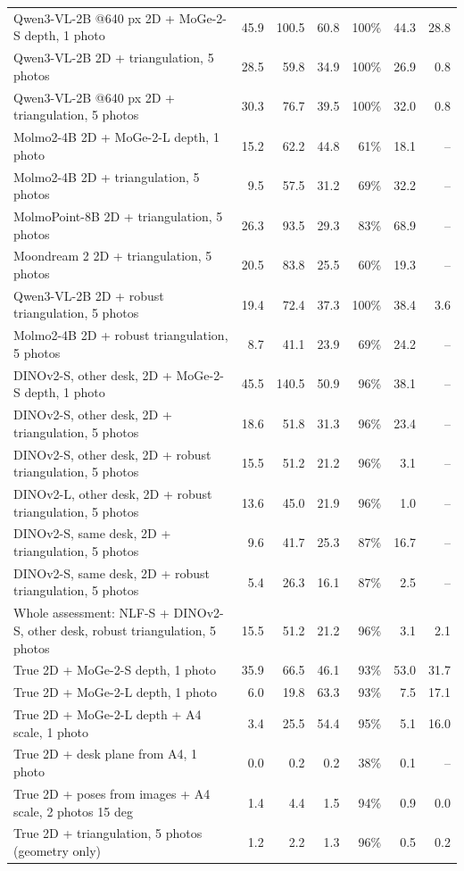{\begin{tabular}{@{}p{6.3cm}rrrrrr@{}}
Qwen3-VL-2B @640 px 2D + MoGe-2-S depth, 1 photo & 45.9 & 100.5 & 60.8 & 100\% & 44.3 & 28.8 \\
Qwen3-VL-2B 2D + triangulation, 5 photos & 28.5 & 59.8 & 34.9 & 100\% & 26.9 & 0.8 \\
Qwen3-VL-2B @640 px 2D + triangulation, 5 photos & 30.3 & 76.7 & 39.5 & 100\% & 32.0 & 0.8 \\
Molmo2-4B 2D + MoGe-2-L depth, 1 photo & 15.2 & 62.2 & 44.8 & 61\% & 18.1 & -- \\
Molmo2-4B 2D + triangulation, 5 photos & 9.5 & 57.5 & 31.2 & 69\% & 32.2 & -- \\
MolmoPoint-8B 2D + triangulation, 5 photos & 26.3 & 93.5 & 29.3 & 83\% & 68.9 & -- \\
Moondream 2 2D + triangulation, 5 photos & 20.5 & 83.8 & 25.5 & 60\% & 19.3 & -- \\
Qwen3-VL-2B 2D + robust triangulation, 5 photos & 19.4 & 72.4 & 37.3 & 100\% & 38.4 & 3.6 \\
Molmo2-4B 2D + robust triangulation, 5 photos & 8.7 & 41.1 & 23.9 & 69\% & 24.2 & -- \\
DINOv2-S, other desk, 2D + MoGe-2-S depth, 1 photo & 45.5 & 140.5 & 50.9 & 96\% & 38.1 & -- \\
DINOv2-S, other desk, 2D + triangulation, 5 photos & 18.6 & 51.8 & 31.3 & 96\% & 23.4 & -- \\
DINOv2-S, other desk, 2D + robust triangulation, 5 photos & 15.5 & 51.2 & 21.2 & 96\% & 3.1 & -- \\
DINOv2-L, other desk, 2D + robust triangulation, 5 photos & 13.6 & 45.0 & 21.9 & 96\% & 1.0 & -- \\
DINOv2-S, same desk, 2D + triangulation, 5 photos & 9.6 & 41.7 & 25.3 & 87\% & 16.7 & -- \\
DINOv2-S, same desk, 2D + robust triangulation, 5 photos & 5.4 & 26.3 & 16.1 & 87\% & 2.5 & -- \\
Whole assessment: NLF-S + DINOv2-S, other desk, robust triangulation, 5 photos & 15.5 & 51.2 & 21.2 & 96\% & 3.1 & 2.1 \\
True 2D + MoGe-2-S depth, 1 photo & 35.9 & 66.5 & 46.1 & 93\% & 53.0 & 31.7 \\
True 2D + MoGe-2-L depth, 1 photo & 6.0 & 19.8 & 63.3 & 93\% & 7.5 & 17.1 \\
True 2D + MoGe-2-L depth + A4 scale, 1 photo & 3.4 & 25.5 & 54.4 & 95\% & 5.1 & 16.0 \\
True 2D + desk plane from A4, 1 photo & 0.0 & 0.2 & 0.2 & 38\% & 0.1 & -- \\
True 2D + poses from images + A4 scale, 2 photos 15 deg & 1.4 & 4.4 & 1.5 & 94\% & 0.9 & 0.0 \\
True 2D + triangulation, 5 photos (geometry only) & 1.2 & 2.2 & 1.3 & 96\% & 0.5 & 0.2 \\
\bottomrule
\end{tabular}}
